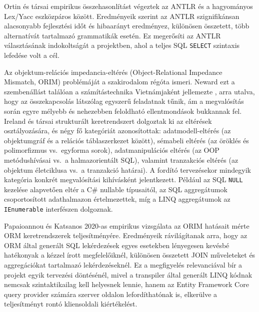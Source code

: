 Ortin és társai \cite{ortin2022antlr} empirikus összehasonlítást végeztek az ANTLR és a hagyományos Lex/Yacc eszközpáros között. Eredményeik szerint az ANTLR szignifikánsan alacsonyabb fejlesztési időt és hibaarányt eredményez, különösen összetett, több alternatívát tartalmazó grammatikák esetén. Ez megerősíti az ANTLR választásának indokoltságát a projektben, ahol a teljes SQL \texttt{SELECT} szintaxis lefedése volt a cél.


Az objektum-relációs impedancia-eltérés (Object-Relational Impedance Mismatch, ORIM) problémáját a szakirodalom régóta ismeri. Neward ezt a szembenállást találóan a számítástechnika Vietnámjaként jellemezte \cite{neward2006vietnam}, arra utalva, hogy az összekapcsolás látszólag egyszerű feladatnak tűnik, ám a megvalósítás során egyre mélyebb és nehezebben feloldható ellentmondások bukkannak fel. Ireland és társai \cite{ireland2009orim} strukturált keretrendszert dolgoztak ki az eltérések osztályozására, és négy fő kategóriát azonosítottak: adatmodell-eltérés (az objektumgráf és a relációs táblaszerkezet között), sémabeli eltérés (az öröklés és polimorfizmus vs.\ egyforma sorok), adatmanipulációs eltérés (az OOP metódushívásai vs.\ a halmazorientált SQL), valamint tranzakciós eltérés (az objektum életciklusa vs.\ a tranzakció határai). A fordító tervezésekor mindegyik kategória konkrét megvalósítási kihívásként jelentkezett. Például az SQL \texttt{NULL} kezelése alapvetően eltér a C\# nullable típusaitól, az SQL aggregátumok csoportosított adathalmazon értelmezettek, míg a LINQ aggregátumok az \texttt{IEnumerable} interfészen dolgoznak.

Papaioannou és Katsanos \cite{papaioannou2020orim} 2020-as empirikus vizsgálata az ORIM hatásait mérte ORM keretrendszerek teljesítményére. Eredményeik rávilágítanak arra, hogy az ORM által generált SQL lekérdezések egyes esetekben lényegesen kevésbé hatékonyak a kézzel írott megfelelőiknél, különösen összetett JOIN műveleteket és aggregációkat tartalmazó lekérdezéseknél. Ez a megfigyelés relevanciával bír a projekt egyik tervezési döntésénél, mivel a transpiler által generált LINQ kódnak nemcsak szintaktikailag kell helyesnek lennie, hanem az Entity Framework Core query provider számára szerver oldalon lefordíthatónak is, elkerülve a teljesítményt rontó kliensoldali kiértékelést.


